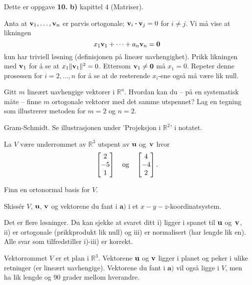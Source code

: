 \begin{losning}
\begin{punkt}
Dette er oppgave \textbf{10. b)} kapittel 4 (Matriser).
\end{punkt}
\begin{punkt}
Anta at $\mathbf{v}_1,\dots,\mathbf{v}_n$ er parvis ortogonale; $\mathbf{v}_i\boldsymbol{\cdot}\mathbf{v}_j=0$ for $i\neq j$. Vi må vise at likningen $$x_1\mathbf{v}_1+\dots+a_n\mathbf{v}_n=\mathbf{0}$$ kun har triviell løsning (definisjonen på lineær uavhengighet). Prikk likningen med $\mathbf{v}_1$ for å se at $x_1\|\mathbf{v}_1\|^2=0$. Ettersom $\mathbf{v}_1\neq \mathbf{0}$ må $x_1=0$. Repeter denne prosessen for $i=2,\dots,n$ for å se at de resterende $x_i$-ene også må være lik null.
\end{punkt}
\end{losning}

\begin{oppgave}
Gitt $m$ lineært uavhengige vektorer i $\mathbb{R}^n$. Hvordan kan du -- på en systematisk måte -- finne $m$ ortogonale vektorer med det samme utspennet? Lag en tegning som illustrerer metoden for $m=2$ og $n=2$.
\end{oppgave}

\begin{losning}
Gram-Schmidt. Se illustrasjonen under 'Projeksjon i $\mathbb{R}^2$' i notatet.
\end{losning}

\begin{oppgave}
La $V$ være underrommet av $\mathbb{R}^3$ utspent av $\mathbf{u}$ og~$\mathbf{v}$ hvor 
$$\begin{bmatrix} 2 \\ -5 \\ 1 \end{bmatrix} \quad \text{og} \quad \begin{bmatrix} 4 \\ -4 \\ 2 \end{bmatrix}.$$

\begin{punkt}
Finn en ortonormal basis for $V$.
\end{punkt}

\begin{punkt}
Skissér $V$, $\mathbf{u}$, $\mathbf{v}$ og vektorene du fant i $\textbf{a)}$ i et $x-y-z$-koordinatsystem.
\end{punkt}

\end{oppgave}

\begin{losning}

\begin{punkt}
Det er flere løsninger. Du kan sjekke at svaret ditt i) ligger i spanet til $\mathbf{u}$ og~$\mathbf{v}$, ii) er ortogonale (prikkprodukt lik null) og iii) er normalisert (har lengde lik en). Alle svar som tilfredstiller i)-iii) er korrekt.
\end{punkt}
\begin{punkt}
Vektorrommet $V$ er et plan i $\mathbb{R}^3$. Vektorene $\mathbf{u}$ og $\mathbf{v}$ ligger i planet og peker i ulike retninger (er lineært uavhengige). Vektorene du fant i $\textbf{a)}$ vil også ligge i $V$, men ha lik lengde og 90 grader mellom hverandre.
\end{punkt}

\end{losning}

